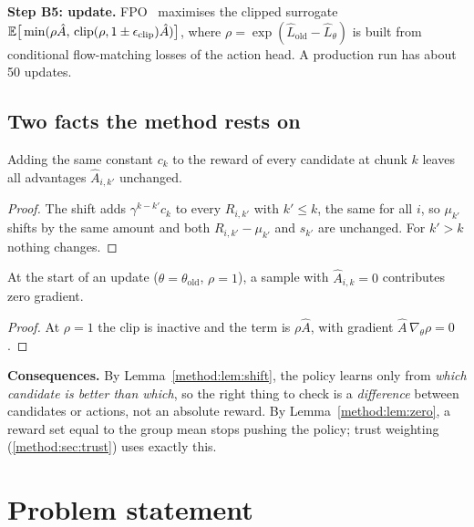 \textbf{Step B5: update.} FPO~\cite{fpo} maximises the clipped surrogate $\mathbb{E}\big[\min(\rho\hat A,\,\mathrm{clip}(\rho,1\pm\epsilon_{\mathrm{clip}})\hat A)\big]$, where $\rho=\exp(\hat L_{\mathrm{old}}-\hat L_\theta)$ is built from conditional flow-matching losses of the action head. A production run has about 50 updates.

\subsection{Two facts the method rests on}
\begin{lemma}\label{method:lem:shift}
Adding the same constant $c_k$ to the reward of every candidate at chunk $k$ leaves all advantages $\hat A_{i,k'}$ unchanged.
\end{lemma}
\begin{proof}
The shift adds $\gamma^{k-k'}c_k$ to every $R_{i,k'}$ with $k'\le k$, the same for all $i$, so $\mu_{k'}$ shifts by the same amount and both $R_{i,k'}-\mu_{k'}$ and $s_{k'}$ are unchanged. For $k'>k$ nothing changes.
\end{proof}
\begin{lemma}\label{method:lem:zero}
At the start of an update ($\theta=\theta_{\mathrm{old}}$, $\rho=1$), a sample with $\hat A_{i,k}=0$ contributes zero gradient.
\end{lemma}
\begin{proof}
At $\rho=1$ the clip is inactive and the term is $\rho\hat A$, with gradient $\hat A\,\nabla_\theta\rho=0$.
\end{proof}
\begin{why}
\textbf{Consequences.} By Lemma~\ref{method:lem:shift}, the policy learns only from \emph{which candidate is better than which}, so the right thing to check is a \emph{difference} between candidates or actions, not an absolute reward. By Lemma~\ref{method:lem:zero}, a reward set equal to the group mean stops pushing the policy; trust weighting (\ref{method:sec:trust}) uses exactly this.
\end{why}

\section{Problem statement}\label{method:sec:problem}

